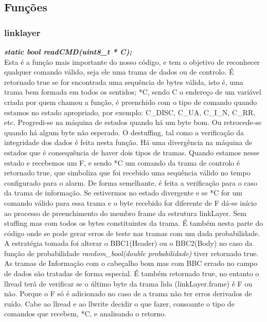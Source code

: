 \documentclass[a4paper]{article}
\begin{document}

\subsection{Funções}
\subsubsection{linklayer}
\textbf{\textit{static bool readCMD(uint8\_t * C);}}\\
Esta é a função mais importante do nosso código, e tem o objetivo de reconhecer
qualquer comando válido, seja ele uma trama de dados ou de controlo. É
retornado true se for encontrada uma sequência de bytes válida, isto é, uma
trama bem formada em todos os sentidos; *C, sendo C o endereço de um variável
criada por quem chamou a função, é preenchido com o tipo de comando
quando estamos no estado apropriado,
por exemplo: C\_DISC, C\_UA, C\_I\_N, C\_RR, etc.
Progredi-se na máquina de estados quando há um byte bom. Ou retrocede-se
quando há algum byte não esperado. O destuffing, tal como a verificação da integridade dos
dados é feita nesta função. Há uma divergência na máquina de estados que é
consequência de haver dois tipos de tramas. Quando estamos nesse estado e
recebemos um F, e sendo *C um comando da trama de controlo é retornado true,
que simboliza que foi recebido uma sequência válido no tempo configurado para o
alarm. De forma semelhante, é feita a verificação para o caso da trama de
informação. Se estivermos no estado divergente e se *C for um comando válido
para essa trama e o byte recebido for diferente de F dá-se início ao processo
de preenchimento do membro frame da estrutura linkLayer. Sem stuffing mas com
todos os bytes constituintes da trama. É também nesta parte do código onde se
pode gerar erros de teste nas tramas com um dada probabilidade. A estratégia
tomada foi alterar o BBC1(Header) ou o BBC2(Body) no caso da função de
probabilidade \textit{random\_bool(double probabilidade)} tiver retornado true.
As tramas de Informação com o cabeçalho bom mas com BBC errado no campo de
dados são tratadas de forma especial. É também retornado true, no entanto o
llread terá de verificar se o último byte da trama lida (linkLayer.frame) é
F ou não. Porque o F só é adicionado no caso de a trama não ter erros
derivados de ruído. Cabe ao llread e ao llwrite decidir o que fazer, consoante
o tipo de comandos que recebem, *C, e analisando o retorno.\linebreak
\end{document}

